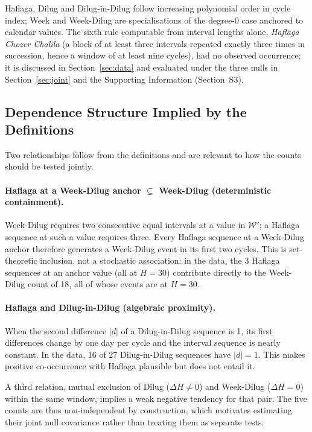 \documentclass[12pt]{article}
\begin{document}
Haflaga, Dilug and Dilug-in-Dilug follow increasing polynomial order in cycle index;
Week and Week-Dilug are specialisations of the degree-0 case anchored to calendar
values. The sixth rule computable from interval lengths alone, \textit{Haflaga Chozer
Chalila} (a block of at least three intervals repeated exactly three times in
succession, hence a window of at least nine cycles), had no observed occurrence; it is
discussed in Section~\ref{sec:data} and evaluated under the three nulls in
Section~\ref{sec:joint} and the Supporting Information (Section~S3).

\subsection{Dependence Structure Implied by the Definitions}
\label{sec:mathdep}

Two relationships follow from the definitions and are relevant to how the counts should
be tested jointly.

\paragraph{Haflaga at a Week-Dilug anchor $\subseteq$ Week-Dilug (deterministic
containment).}
Week-Dilug requires two consecutive equal intervals at a value in $\mathcal{W}'$; a
Haflaga sequence at such a value requires three. Every Haflaga sequence at a Week-Dilug
anchor therefore generates a Week-Dilug event in its first two cycles. This is
set-theoretic inclusion, not a stochastic association: in the data, the 3 Haflaga
sequences at an anchor value (all at $H = 30$) contribute directly to the Week-Dilug
count of 18, all of whose events are at $H = 30$.

\paragraph{Haflaga and Dilug-in-Dilug (algebraic proximity).}
When the second difference $|d|$ of a Dilug-in-Dilug sequence is 1, its first
differences change by one day per cycle and the interval sequence is nearly constant. In
the data, 16 of 27 Dilug-in-Dilug sequences have $|d| = 1$. This makes positive
co-occurrence with Haflaga plausible but does not entail it.

A third relation, mutual exclusion of Dilug ($\Delta H \neq 0$) and Week-Dilug
($\Delta H = 0$) within the same window, implies a weak negative tendency for that pair.
The five counts are thus non-independent by construction, which motivates estimating
their joint null covariance rather than treating them as separate tests.
\end{document}
